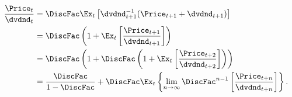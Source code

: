 \begin{equation*}\begin{gathered}\begin{aligned}
\frac{\Price_{t}}{\dvdnd_{t}} & =  \DiscFac \Ex_{t}\left[\dvdnd_{t+1}^{-1}(\Price_{t+1}+\dvdnd_{t+1})\right] \label{eq:pofdLog}
\\ & =  \DiscFac \left(1+\Ex_{t} \left[\frac{{\Price}_{t+1}}{\dvdnd_{t+1}}\right]\right)
\\ & =  \DiscFac \left(1+\DiscFac \left(1+\Ex_{t}\left[\frac{{\Price}_{t+2}}{\dvdnd_{t+2}}\right]\right)\right)
\\ & =  \frac{\DiscFac}{1-\DiscFac} + \DiscFac \Ex_{t}\left\{\lim_{n\rightarrow \infty}\DiscFac^{n-1}\left[\frac{\Price_{t+n}}{\dvdnd_{t+n}}\right]\right\}.
\end{aligned}\end{gathered}\end{equation*}
